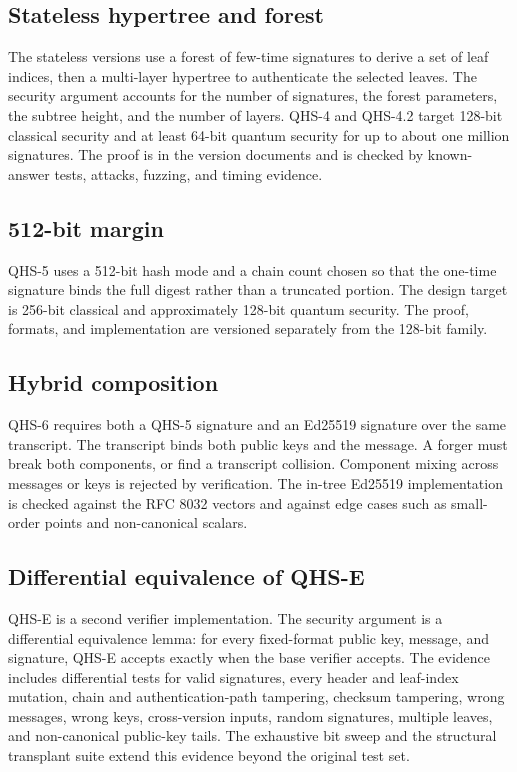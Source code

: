 \documentclass[11pt,a4paper]{article}
\begin{document}
\subsection{Stateless hypertree and forest}

The stateless versions use a forest of few-time signatures to derive a set of
leaf indices, then a multi-layer hypertree to authenticate the selected leaves.
The security argument accounts for the number of signatures, the forest
parameters, the subtree height, and the number of layers. QHS-4 and QHS-4.2
target 128-bit classical security and at least 64-bit quantum security for up
to about one million signatures. The proof is in the version documents and is
checked by known-answer tests, attacks, fuzzing, and timing evidence.

\subsection{512-bit margin}

QHS-5 uses a 512-bit hash mode and a chain count chosen so that the one-time
signature binds the full digest rather than a truncated portion. The design
target is 256-bit classical and approximately 128-bit quantum security. The
proof, formats, and implementation are versioned separately from the 128-bit
family.

\subsection{Hybrid composition}

QHS-6 requires both a QHS-5 signature and an Ed25519 signature over the same
transcript. The transcript binds both public keys and the message. A forger
must break both components, or find a transcript collision. Component mixing
across messages or keys is rejected by verification. The in-tree Ed25519
implementation is checked against the RFC 8032 vectors and against edge cases
such as small-order points and non-canonical scalars.

\subsection{Differential equivalence of QHS-E}

QHS-E is a second verifier implementation. The security argument is a
differential equivalence lemma: for every fixed-format public key, message, and
signature, QHS-E accepts exactly when the base verifier accepts. The evidence
includes differential tests for valid signatures, every header and leaf-index
mutation, chain and authentication-path tampering, checksum tampering, wrong
messages, wrong keys, cross-version inputs, random signatures, multiple leaves,
and non-canonical public-key tails. The exhaustive bit sweep and the structural
transplant suite extend this evidence beyond the original test set.
\end{document}
